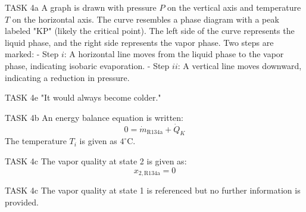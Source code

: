 TASK 4a  
A graph is drawn with pressure \( P \) on the vertical axis and temperature \( T \) on the horizontal axis. The curve resembles a phase diagram with a peak labeled "KP" (likely the critical point). The left side of the curve represents the liquid phase, and the right side represents the vapor phase. Two steps are marked:  
- Step \( i \): A horizontal line moves from the liquid phase to the vapor phase, indicating isobaric evaporation.  
- Step \( ii \): A vertical line moves downward, indicating a reduction in pressure.  

TASK 4e  
"It would always become colder."  

TASK 4b  
An energy balance equation is written:  
\[
0 = \dot{m}_{\text{R134a}} + \dot{Q}_K
\]  
The temperature \( T_i \) is given as \( 4^\circ\text{C} \).  

TASK 4c  
The vapor quality at state 2 is given as:  
\[
x_{2,\text{R134a}} = 0
\]  

TASK 4c  
The vapor quality at state 1 is referenced but no further information is provided.